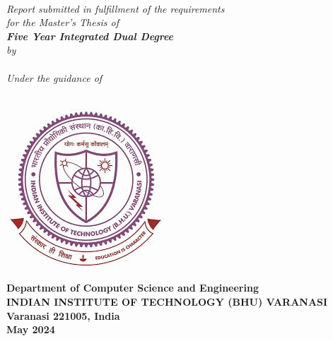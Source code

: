 \begin{titlepage}
\thispagestyle{empty}
\mbox{}
\begin{center}
\setlength{\textheight}{20.5in}
\setlength{\textwidth}{20.5in} 
\begin{spacing}{1.725}
{\LARGE\bf \thetitle}\\[9ex]
\end{spacing}
\emph{Report submitted in fulfillment of the requirements\\
for the Master's Thesis of\\
[2ex]\large \bf Five Year Integrated Dual Degree
}\\
[2ex] \emph{by} \\[2ex]
{\large\sf \bf \theauthor}\\ [7ex] 
\emph{Under the guidance of}\\[1ex]
{\large \sf \bf \supervisor} \\[7ex]

\vspace{.05in}
\begin{center}
 \includegraphics[scale=.7,keepaspectratio=true]{./logo.jpeg}
\end{center}
% 

\vspace{1cm}
{\small  \bf Department of Computer Science and Engineering}  \\[1ex]
{\small \bf{INDIAN INSTITUTE OF TECHNOLOGY (BHU) VARANASI \\
Varanasi 221005, India\\
  May 2024}}

\end{center}
\end{titlepage}

